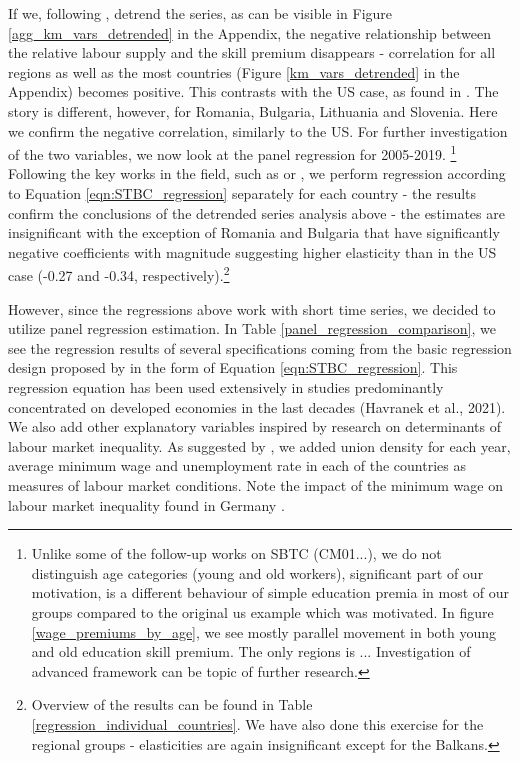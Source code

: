\documentclass[11pt]{article}
\begin{document}
If we, following \citet{acemoglu2012does}, detrend the series, as can be visible in Figure \ref{agg_km_vars_detrended} in the Appendix, the negative relationship between the relative labour supply and the skill premium disappears - correlation for all regions as well as the most countries (Figure \ref{km_vars_detrended} in the Appendix) becomes positive. This contrasts with the US case, as found in \citet{acemoglu2012does}. The story is different, however, for Romania, Bulgaria, Lithuania and Slovenia. Here we confirm the negative correlation, similarly to the US.
For further investigation of the two variables, we now look at the panel regression for 2005-2019.
\footnote{Unlike some of the follow-up works on SBTC (CM01...), we do not distinguish age categories (young and old workers), significant part of our motivation, is a different behaviour of simple education premia in most of our groups compared to the original us example which was motivated. In figure \ref{wage_premiums_by_age}, we see mostly parallel movement in both young and old education skill premium. The only regions is ... Investigation of advanced framework can be topic of further research.}   %
Following the key works in the field, such as \citet{katz1992changes} or \citet{acemoglu2012does}, we perform regression according to Equation \ref{eqn:STBC_regression} separately for each country - the results confirm the conclusions of the detrended series analysis above - the estimates are insignificant with the exception of Romania and Bulgaria that have significantly negative coefficients with magnitude suggesting higher elasticity than in the US case (-0.27 and -0.34, respectively).\footnote{Overview of the results can be found in Table \ref{regression_individual_countries}. We have also done this exercise for the regional groups - elasticities are again insignificant except for the Balkans.}

However, since the regressions above work with short time series, we decided to utilize panel regression estimation. In Table \ref{panel_regression_comparison}, we see the regression results of several specifications coming from the basic regression design proposed by \citet{katz1992changes} in the form of Equation \ref{eqn:STBC_regression}. This regression equation has been used extensively in studies predominantly concentrated on developed economies in the last decades (Havranek et al., 2021). We also add other explanatory variables inspired by research on determinants of labour market inequality. As suggested by \citet{farber2021unions}, we added union density for each year, average minimum wage and unemployment rate in each of the countries as measures of labour market conditions. Note the impact of the minimum wage on labour market inequality found in Germany \citep{bossler2020wage}.
\end{document}
